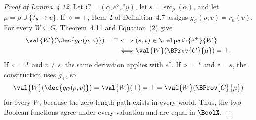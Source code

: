 \documentclass[sigconf, nonacm]{acmart}
\begin{document}
\begin{proof}[Proof of Lemma~4.12]
Let $C=(\alpha,e^\diamond,?y)$, let $s=\operatorname{src}_{\rho}(\alpha)$, and let $\mu=\rho\cup\{?y\mapsto v\}$. If $\diamond=+$, Item~2 of Definition~4.7 assigns $g_C(\rho,v)=r_n(v)$. For every $W\subseteq G$, Theorem~4.11 and Equation~(2) give
\begin{align*}
 \val{W}(\dec{g_C(\rho,v)})=\top
 &\Longleftrightarrow (s,v)\in\relpath{e^+}{W}\\
 &\Longleftrightarrow \val{W}(\BProv{C}{\mu})=\top.
\end{align*}
If $\diamond=*$ and $v\ne s$, the same derivation applies with $e^*$. If $\diamond=*$ and $v=s$, the construction uses $g_\top$, so
\[
 \val{W}(\dec{g_C(\rho,v)})=\val{W}(\top)=\top
 =\val{W}(\BProv{C}{\mu})
\]
for every $W$, because the zero-length path exists in every world. Thus, the two Boolean functions agree under every valuation and are equal in $\BoolX$.
\end{proof}
\end{document}
